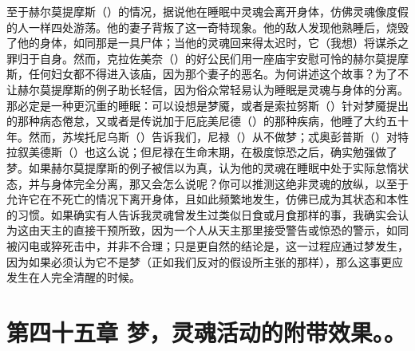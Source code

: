 至于赫尔莫提摩斯（）的情况，据说他在睡眠中灵魂会离开身体，仿佛灵魂像度假的人一样四处游荡。他的妻子背叛了这一奇特现象。他的敌人发现他熟睡后，烧毁了他的身体，如同那是一具尸体；当他的灵魂回来得太迟时，它（我想）将谋杀之罪归于自身。然而，克拉佐美奈（）的好公民们用一座庙宇安慰可怜的赫尔莫提摩斯，任何妇女都不得进入该庙，因为那个妻子的恶名。为何讲述这个故事？为了不让赫尔莫提摩斯的例子助长轻信，因为俗众常轻易认为睡眠是灵魂与身体的分离。那必定是一种更沉重的睡眠：可以设想是梦魇，或者是索拉努斯（）针对梦魇提出的那种病态倦怠，又或者是传说加于厄庇美尼德（）的那种疾病，他睡了大约五十年。然而，苏埃托尼乌斯（）告诉我们，尼禄（）从不做梦；忒奥彭普斯（）对特拉叙美德斯（）也这么说；但尼禄在生命末期，在极度惊恐之后，确实勉强做了梦。如果赫尔莫提摩斯的例子被信以为真，认为他的灵魂在睡眠中处于实际怠惰状态，并与身体完全分离，那又会怎么说呢？你可以推测这绝非灵魂的放纵，以至于允许它在不死亡的情况下离开身体，且如此频繁地发生，仿佛已成为其状态和本性的习惯。如果确实有人告诉我灵魂曾发生过类似日食或月食那样的事，我确实会认为这由天主的直接干预所致，因为一个人从天主那里接受警告或惊恐的警示，如同被闪电或猝死击中，并非不合理；只是更自然的结论是，这一过程应通过梦发生，因为如果必须认为它不是梦（正如我们反对的假设所主张的那样），那么这事更应发生在人完全清醒的时候。\par


\section{第四十五章 梦，灵魂活动的附带效果。。}

